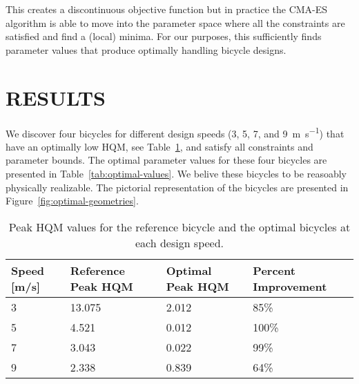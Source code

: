 \documentclass{bmd2019p}
\begin{document}
This creates a discontinuous objective function but in practice the CMA-ES
algorithm is able to move into the parameter space where all the constraints
are satisfied and find a (local) minima. For our purposes, this sufficiently
finds parameter values that produce optimally handling bicycle designs.

\section{RESULTS}
%
We discover four bicycles for different design speeds (3, 5, 7, and
9~\si{\meter\per\second}) that have an optimally low HQM, see
Table~\ref{tab:hqm}, and satisfy all constraints and parameter bounds. The
optimal parameter values for these four bicycles are presented in
Table~\ref{tab:optimal-values}. We belive these bicycles to be reasoably
physically realizable. The pictorial representation of the bicycles are
presented in Figure~\ref{fig:optimal-geometries}.
%
\begin{table}
  \caption{Peak HQM values for the reference bicycle and the optimal bicycles
    at each design speed.}
  \label{tab:hqm}
  \centering
  \begin{tabular}{llll}
    \toprule
    Speed [m/s] & Reference Peak HQM & Optimal Peak HQM & Percent Improvement \\
    \midrule
    3 & 13.075 & 2.012 & 85\% \\
    5 & 4.521  & 0.012 & 100\% \\
    7 & 3.043  & 0.022 & 99\% \\
    9 & 2.338  & 0.839 & 64\% \\
    \bottomrule
  \end{tabular}
\end{table}
%
\end{document}
